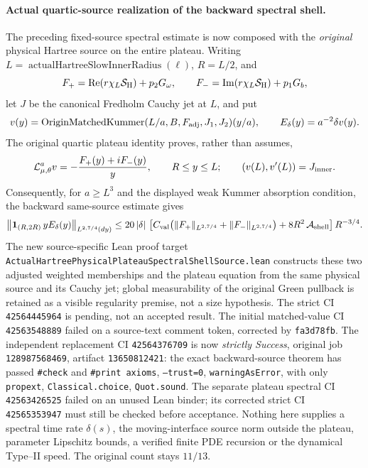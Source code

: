 \documentclass[11pt]{amsart}
\begin{document}
\paragraph{Actual quartic-source realization of the backward spectral shell.}
The preceding fixed-source spectral estimate is now composed with
the \emph{original} physical Hartree source on the entire plateau.
Writing \(L=\operatorname{actualHartreeSlowInnerRadius}(\ell)\),
\(R=L/2\), and
\[
 F_+=\operatorname{Re}(r\chi_L\mathcal S_{\rm H})+
             p_2G_{\omega},\qquad
 F_-=\operatorname{Im}(r\chi_L\mathcal S_{\rm H})+
             p_1G_b,
\]
let \(J\) be the canonical Fredholm Cauchy jet at \(L\), and put
\[
 v(y)=\operatorname{OriginMatchedKummer}
    (L/a,B,F_{\rm adj},J_1,J_2)(y/a),\qquad
 E_\delta(y)=a^{-2}\delta v(y).
\]
The original quartic plateau identity proves, rather than assumes,
\[
 \mathcal L^a_{\mu,\theta}v
      =-\frac{F_+(y)+iF_-(y)}{y},\qquad R\le y\le L;
 \qquad (v(L),v'(L))=J_{\rm inner}.
\]
Consequently, for \(a\ge L^3\) and the displayed weak Kummer
absorption condition, the backward same-source estimate gives
\[
 \big\|\mathbf 1_{(R,2R)}\,yE_\delta(y)
       \big\|_{L^{2,7/4}(dy)}
 \le 20\,|\delta|\,
 \left[C_{\rm val}\bigl(\|F_+\|_{L^{2,7/4}}
                   +\|F_-\|_{L^{2,7/4}}\bigr)
       +8R^2\,\mathcal A_{\rm shell}\right]R^{-3/4}.
\]
The new source-specific Lean proof target
\texttt{ActualHartreePhysicalPlateauSpectralShellSource.lean}
constructs these two adjusted weighted memberships and the plateau
equation from the same physical source and its Cauchy jet;
global measurability of the original Green pullback is retained
as a visible regularity premise, not a size hypothesis.
The strict CI \texttt{42564445964} is pending, not an accepted result.
The initial matched-value CI \texttt{42563548889} failed on a
source-text comment token, corrected by \texttt{fa3d78fb}.
The independent replacement CI \texttt{42564376709} is now
\emph{strictly Success}, original job \texttt{128987568469},
artifact \texttt{13650812421}: the exact backward-source theorem
has passed \texttt{\#check} and \texttt{\#print axioms},
\texttt{--trust=0}, \texttt{warningAsError}, with only
\texttt{propext}, \texttt{Classical.choice}, \texttt{Quot.sound}.
The separate plateau spectral CI \texttt{42563426525} failed on
an unused Lean binder; its corrected strict CI
\texttt{42565353947} must still be checked before acceptance.  Nothing here supplies a spectral time rate
\(\delta(s)\), the moving-interface source norm outside the plateau,
parameter Lipschitz bounds, a verified finite PDE recursion or
the dynamical Type--II speed. The original count stays \(11/13\).
\end{document}
